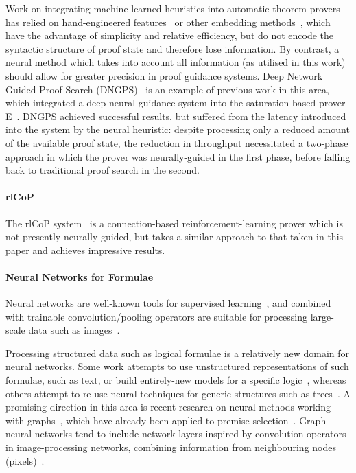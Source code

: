 \documentclass{llncs}
\begin{document}
Work on integrating machine-learned heuristics into automatic theorem provers has relied on hand-engineered features~\cite{MaLeCoP,FEMaLeCoP,rlCoP} or other embedding methods~\cite{ENIGMA}, which have the advantage of simplicity and relative efficiency, but do not encode the syntactic structure of proof state and therefore lose information.
By contrast, a neural method which takes into account all information (as utilised in this work) should allow for greater precision in proof guidance systems.
Deep Network Guided Proof Search (DNGPS)~\cite{DNGPS} is an example of previous work in this area, which integrated a deep neural guidance system into the saturation-based prover E~\cite{E}.
DNGPS achieved successful results, but suffered from the latency introduced into the system by the neural heuristic: despite processing only a reduced amount of the available proof state, the reduction in throughput necessitated a two-phase approach in which the prover was neurally-guided in the first phase, before falling back to traditional proof search in the second.

\paragraph{rlCoP} The rlCoP system~\cite{rlCoP} is a connection-based reinforcement-learning prover which is not presently neurally-guided, but takes a similar approach to that taken in this paper and achieves impressive results.

\paragraph{Neural Networks for Formulae}
Neural networks are well-known tools for supervised learning~\cite{neural-survey}, and combined with trainable convolution/pooling operators are suitable for processing large-scale data such as images~\cite{cnn}.

Processing structured data such as logical formulae is a relatively new domain for neural networks.
Some work attempts to use unstructured representations of such formulae, such as text, or build entirely-new models for a specific logic~\cite{logical-entailment}, whereas others attempt to re-use neural techniques for generic structures such as trees~\cite{logical-tree}.
A promising direction in this area is recent research on neural methods working with graphs~\cite{graph-cnn,gcn,gcn-relational}, which have already been applied to premise selection~\cite{formula-graph}.
Graph neural networks tend to include network layers inspired by convolution operators in image-processing networks, combining information from neighbouring nodes (pixels)~\cite{gcn}.
\end{document}
